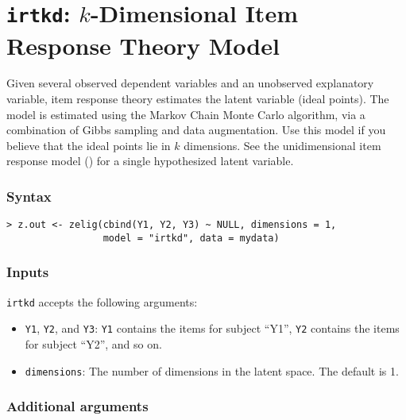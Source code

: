 \section{\texttt{irtkd}: $k$-Dimensional Item Response Theory Model}

\label{irtkd}

Given several observed dependent variables and an unobserved
explanatory variable, item response theory estimates the latent
variable (ideal points).  The model is estimated using the Markov
Chain Monte Carlo algorithm, via a combination of Gibbs sampling and
data augmentation.  Use this model if you believe that the ideal
points lie in $k$ dimensions.  See the unidimensional item response
model () for a single hypothesized latent variable. 

\subsubsection{Syntax}
\begin{verbatim}
> z.out <- zelig(cbind(Y1, Y2, Y3) ~ NULL, dimensions = 1, 
                 model = "irtkd", data = mydata)
\end{verbatim}

\subsubsection{Inputs}
\texttt{irtkd} accepts the following arguments:
\begin{itemize}
\item \texttt{Y1}, {\tt Y2}, and \texttt{Y3}: \texttt{Y1} contains the items for 
subject ``Y1'', \texttt{Y2} contains the items for subject ``Y2'', and so on. 

\item \texttt{dimensions}: The number of dimensions in the latent space. The 
default is 1.

\end{itemize}

\subsubsection{Additional arguments}

